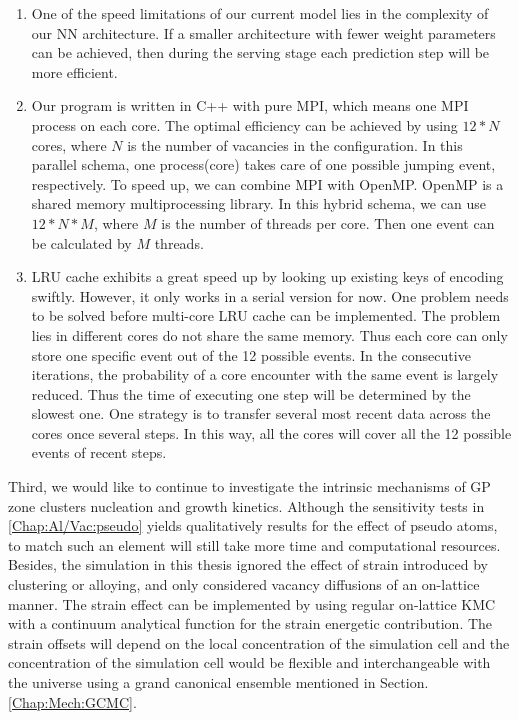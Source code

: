 \begin{enumerate}

  \item One of the speed limitations of our current model lies in the complexity of our \ac{NN} architecture. If a smaller architecture with fewer weight parameters can be achieved, then during the serving stage each prediction step will be more efficient.

  \item Our program is written in C++ with pure \ac{MPI}, which means one \ac{MPI} process on each core. The optimal efficiency can be achieved by using $12*N$ cores, where $N$ is the number of vacancies in the configuration. In this parallel schema, one process(core) takes care of one possible jumping event, respectively. To speed up, we can combine \ac{MPI} with OpenMP. OpenMP is a shared memory multiprocessing library. In this hybrid schema, we can use $12*N*M$, where $M$ is the number of threads per core. Then one event can be calculated by $M$ threads.

  \item \ac{LRU} cache exhibits a great speed up by looking up existing keys of encoding swiftly. However, it only works in a serial version for now. One problem needs to be solved before multi-core \ac{LRU} cache can be implemented. The problem lies in different cores do not share the same memory. Thus each core can only store one specific event out of the 12 possible events. In the consecutive iterations, the probability of a core encounter with the same event is largely reduced. Thus the time of executing one step will be determined by the slowest one. One strategy is to transfer several most recent data across the cores once several steps. In this way, all the cores will cover all the 12 possible events of recent steps.

\end{enumerate}

Third, we would like to continue to investigate the intrinsic mechanisms of GP zone clusters nucleation and growth kinetics. Although the sensitivity tests in \ref{Chap:Al/Vac:pseudo} yields qualitatively results for the effect of pseudo atoms, to match such an element will still take more time and computational resources. Besides, the simulation in this thesis ignored the effect of strain introduced by clustering or alloying, and only considered vacancy diffusions of an on-lattice manner. The strain effect can be implemented by using regular on-lattice \ac{KMC} with a continuum analytical function for the strain energetic contribution. The strain offsets will depend on the local concentration of the simulation cell and the concentration of the simulation cell would be flexible and interchangeable with the universe using a grand canonical ensemble mentioned in Section. \ref{Chap:Mech:GCMC}.

